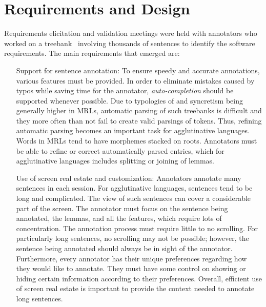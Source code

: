 \section{Requirements and Design}
\label{sec:requirements}

Requirements elicitation and validation meetings were held with annotators who worked on a treebank~\cite{anon} involving thousands of sentences to identify the software requirements.
The main requirements that emerged are:
\begin{itemize}[before=\normalfont, font=\itshape, align=left,noitemsep,topsep=0pt,parsep=3pt,partopsep=0pt,labelsep=3pt,align=left]
    \item[Support for sentence annotation:]
        To ensure speedy and accurate annotations, various features must be provided.
        In order to eliminate mistakes caused by typos while saving time for the annotator, \textit{auto-completion} should be supported whenever possible.
        Due to typologies of and syncretism being generally higher in MRLs, automatic parsing of such treebanks is difficult and they more often than not fail to create valid parsings of tokens.
        Thus, refining automatic parsing becomes an important task for agglutinative languages.
        Words in MRLs tend to have morphemes stacked on roots.
        Annotators must be able to refine or correct automatically parsed entries, which for agglutinative languages includes splitting or joining of lemmas.
    \item[Use of screen real estate and customization:]
        Annotators annotate many sentences in each session.
        For agglutinative languages, sentences tend to be long and complicated.
        The view of such sentences can cover a considerable part of the screen.
        The annotator must focus on the sentence being annotated, the lemmas, and all the features, which require lots of concentration.
        The annotation process must require little to no scrolling.
        For particularly long sentences, no scrolling may not be possible; however, the sentence being annotated should always be in sight of the annotator.
        Furthermore, every annotator has their unique preferences regarding how they would like to annotate.
        They must have some control on showing or hiding certain information according to their preferences.
        Overall, efficient use of screen real estate is important to provide the context needed to annotate long sentences.

\end{itemize}
